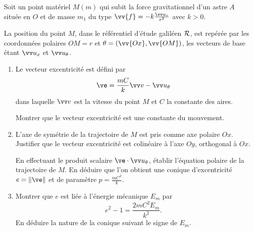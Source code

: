 \begin{exercice}%
  Soit un point matériel \(M (m)\) qui subit la force gravitationnel d'un astre
  \(A\) située en \(O\) et de masse \(m_1\) du type \(\vv{f} = 
  -k\frac{\ur}{r^2}\) avec \(k > 0\).

  La position du point \(M\), dans le référentiel d'étude galiléen \(\mathcal{R}\), 
  est repérée par les coordonnées polaires \(OM = r\) et \(\theta = (\vv{Ox},
  \vv{OM})\), les vecteurs de base étant \(\ux\) et \(\utheta\).

  \begin{enumerate}%
    \item Le vecteur excentricité est défini par \[\ve = \frac{mC}{k} \vvv - 
      \vu_{\theta}\] dans laquelle \(\vvv\) est la vitesse du point \(M\) et 
      \(C\) la constante des aires.

      Montrer que le vecteur excentricité est une constante du mouvement.
    \item L'axe de symétrie de la trajectoire de \(M\) est pris comme axe 
      polaire \(Ox\). Justifier que le vecteur excentricité est colinéaire à 
      l'axe \(Oy\), orthogonal à \(Ox\).

      En effectuant le produit scalaire \(\ve \cdot \utheta\), établir 
      l'équation polaire de la trajectoire de \(M\). En déduire que l'on 
      obtient une conique d'excentricité \(e = \norme{\ve}\) et de paramètre 
      \(p = \frac{mC^2}{k}\).
    \item Montrer que \(e\) est liée à l'énergie mécanique \(E_m\) par \[e^2-1 
      = \frac{2mC^2 E_m}{k^2}.\] En déduire la nature de la conique suivant le 
      signe de \(E_m\).
  \end{enumerate}%
\end{exercice}%
